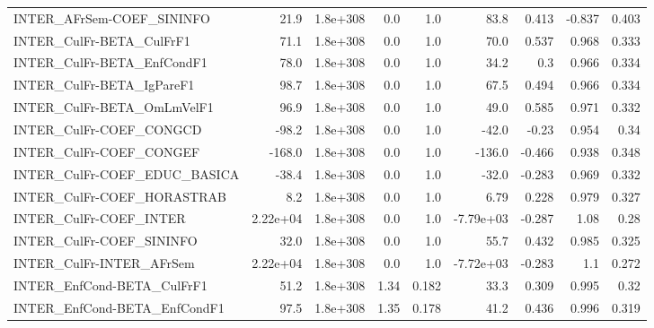 \begin{tabular}{lrrrrrrrr}
INTER\_AFrSem-COEF\_SININFO             &        21.9 &     1.8e+308 &     0.0 &      1.0 &       83.8 &       0.413 &       -0.837 &         0.403 \\
INTER\_CulFr-BETA\_CulFrF1              &        71.1 &     1.8e+308 &     0.0 &      1.0 &       70.0 &       0.537 &        0.968 &         0.333 \\
INTER\_CulFr-BETA\_EnfCondF1            &        78.0 &     1.8e+308 &     0.0 &      1.0 &       34.2 &         0.3 &        0.966 &         0.334 \\
INTER\_CulFr-BETA\_IgPareF1             &        98.7 &     1.8e+308 &     0.0 &      1.0 &       67.5 &       0.494 &        0.966 &         0.334 \\
INTER\_CulFr-BETA\_OmLmVelF1            &        96.9 &     1.8e+308 &     0.0 &      1.0 &       49.0 &       0.585 &        0.971 &         0.332 \\
INTER\_CulFr-COEF\_CONGCD               &       -98.2 &     1.8e+308 &     0.0 &      1.0 &      -42.0 &       -0.23 &        0.954 &          0.34 \\
INTER\_CulFr-COEF\_CONGEF               &      -168.0 &     1.8e+308 &     0.0 &      1.0 &     -136.0 &      -0.466 &        0.938 &         0.348 \\
INTER\_CulFr-COEF\_EDUC\_BASICA          &       -38.4 &     1.8e+308 &     0.0 &      1.0 &      -32.0 &      -0.283 &        0.969 &         0.332 \\
INTER\_CulFr-COEF\_HORASTRAB            &         8.2 &     1.8e+308 &     0.0 &      1.0 &       6.79 &       0.228 &        0.979 &         0.327 \\
INTER\_CulFr-COEF\_INTER                &    2.22e+04 &     1.8e+308 &     0.0 &      1.0 &  -7.79e+03 &      -0.287 &         1.08 &          0.28 \\
INTER\_CulFr-COEF\_SININFO              &        32.0 &     1.8e+308 &     0.0 &      1.0 &       55.7 &       0.432 &        0.985 &         0.325 \\
INTER\_CulFr-INTER\_AFrSem              &    2.22e+04 &     1.8e+308 &     0.0 &      1.0 &  -7.72e+03 &      -0.283 &          1.1 &         0.272 \\
INTER\_EnfCond-BETA\_CulFrF1            &        51.2 &     1.8e+308 &    1.34 &    0.182 &       33.3 &       0.309 &        0.995 &          0.32 \\
INTER\_EnfCond-BETA\_EnfCondF1          &        97.5 &     1.8e+308 &    1.35 &    0.178 &       41.2 &       0.436 &        0.996 &         0.319 \\

\end{tabular}
